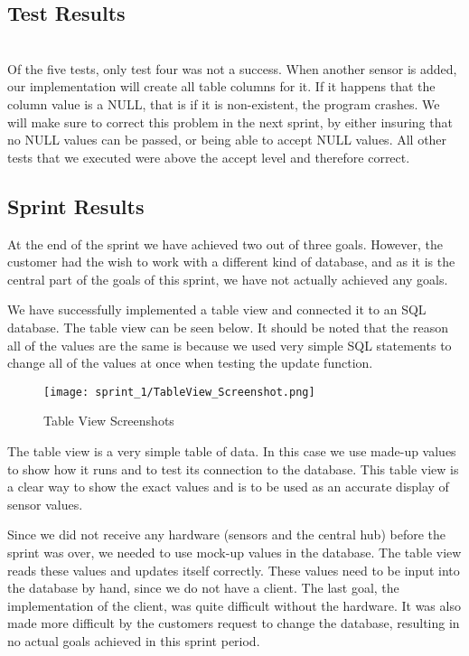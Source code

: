 \documentclass[../document.tex]{subfiles}
\begin{document}
\subsection{Test Results} \ \\
Of the five tests, only test four was not a success. When another sensor is added, our implementation will create all table columns for it. If it happens that the column value is a NULL, that is if it is non-existent, the program crashes. We will make sure to correct this problem in the next sprint, by either insuring that no NULL values can be passed, or being able to accept NULL values. All other tests that we executed were above the accept level and therefore correct.

\subsection{Sprint Results}
At the end of the sprint we have achieved two out of three goals. However, the customer had the wish to work with a different kind of database, and as it is the central part of the goals of this sprint, we have not actually achieved any goals.

We have successfully implemented a table view and connected it to an \gls{SQL} database. The table view can be seen below. It should be noted that the reason all of the values are the same is because we used very simple \gls{SQL} statements to change all of the values at once when testing the update function.

\begin{figure}
\centering
\texttt{[image: sprint\_1/TableView\_Screenshot.png]}
\caption{Table View Screenshots}
\end{figure}

The table view is a very simple table of data. In this case we use made-up values to show how it runs and to test its connection to the database. This table view is a clear way to show the exact values and is to be used as an accurate display of sensor values. 

Since we did not receive any hardware (sensors and the central hub) before the sprint was over, we needed to use mock-up values in the database. The table view reads these values and updates itself correctly. These values need to be input into the database by hand, since we do not have a client. The last goal, the implementation of the client, was quite difficult without the hardware. It was also made more difficult by the customers request to change the database, resulting in no actual goals achieved in this sprint period.
\end{document}
